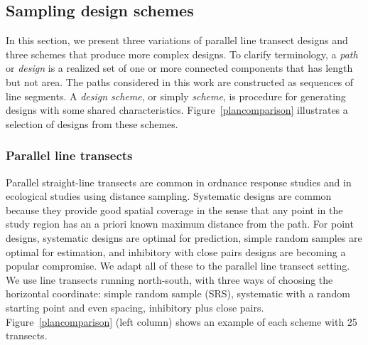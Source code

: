\documentclass[review]{elsarticle}
\begin{document}
\subsection{Sampling design schemes}
\label{methodschemes}

In this section, we present three variations of parallel line transect designs
and three schemes that produce more complex designs. To clarify terminology, a
\emph{path} or \emph{design} is a realized set of one or more connected
components that has length but not area. The paths considered in this work are
constructed as sequences of line segments. A \emph{design scheme}, or simply
\emph{scheme}, is procedure for generating designs with some shared
characteristics. Figure~\ref{plancomparison} illustrates a selection of designs
from these schemes.


\subsubsection{Parallel line transects}

Parallel straight-line transects are common in ordnance response studies and in
ecological studies using distance sampling. Systematic designs are common
because they provide good spatial coverage in the sense that any point in the
study region has an a priori known maximum distance from the path. For point
designs, systematic designs are optimal for prediction, simple random samples
are optimal for estimation, and inhibitory with close pairs designs are
becoming a popular compromise. We adapt all of these to the parallel line
transect setting. We use line transects running north-south, with three ways of
choosing the horizontal coordinate: simple random sample (SRS), systematic with
a random starting point and even spacing, inhibitory plus close pairs.
Figure~\ref{plancomparison} (left column) shows an example of each scheme with
25 transects.

\end{document}
